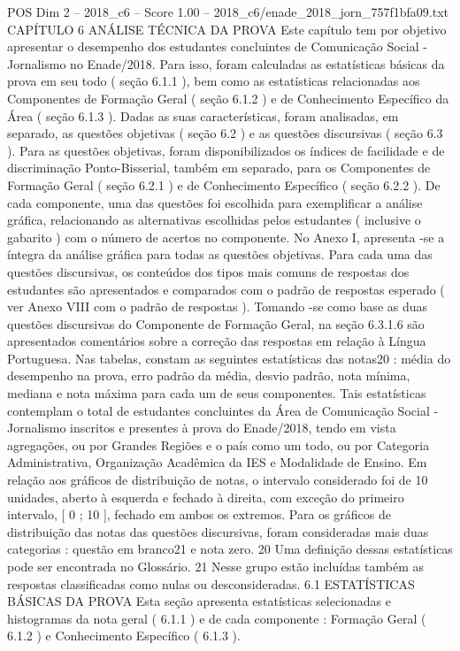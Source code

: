 \begin{textsample}{POS Dim 2 – 2018\_c6 – Score 1.00 – 2018\_c6/enade\_2018\_jorn\_757f1bfa09.txt}  \label{ex:f2_pos_199}
CAPÍTULO 6 ANÁLISE TÉCNICA DA PROVA Este capítulo tem por objetivo apresentar o desempenho dos estudantes concluintes de Comunicação Social - Jornalismo no Enade/2018.
Para isso, foram calculadas as estatísticas básicas da prova em seu todo ( seção 6.1.1 ), bem como as estatísticas relacionadas aos Componentes de Formação Geral ( seção 6.1.2 ) e de Conhecimento Específico da Área ( seção 6.1.3 ).
Dadas as suas características, foram analisadas, em separado, as questões objetivas ( seção 6.2 ) e as questões discursivas ( seção 6.3 ).
Para as questões objetivas, foram disponibilizados os índices de facilidade e de discriminação Ponto-Bisserial, também em separado, para os Componentes de Formação Geral ( seção 6.2.1 ) e de Conhecimento Específico ( seção 6.2.2 ).
De cada componente, uma das questões foi escolhida para exemplificar a análise gráfica, relacionando as alternativas escolhidas pelos estudantes ( inclusive o gabarito ) com o número de acertos no componente.
No Anexo I, apresenta -se a íntegra da análise gráfica para todas as questões objetivas.
Para cada uma das questões discursivas, os conteúdos dos tipos mais comuns de respostas dos estudantes são apresentados e comparados com o padrão de respostas esperado ( ver Anexo VIII com o padrão de respostas ).
Tomando -se como base as duas questões discursivas do Componente de Formação Geral, na seção 6.3.1.6 são apresentados comentários sobre a correção das respostas em relação à Língua Portuguesa.
Nas tabelas, constam as seguintes estatísticas das notas20 : média do desempenho na prova, erro padrão da média, desvio padrão, nota mínima, mediana e nota máxima para cada um de seus componentes.
Tais estatísticas contemplam o total de estudantes concluintes da Área de Comunicação Social - Jornalismo inscritos e presentes à prova do Enade/2018, tendo em vista agregações, ou por Grandes Regiões e o país como um todo, ou por Categoria Administrativa, Organização Acadêmica da IES e Modalidade de Ensino.
Em relação aos gráficos de distribuição de notas, o intervalo considerado foi de 10 unidades, aberto à esquerda e fechado à direita, com exceção do primeiro intervalo, [ 0 ; 10 ], fechado em ambos os extremos.
Para os gráficos de distribuição das notas das questões discursivas, foram consideradas mais duas categorias : questão em branco21 e nota zero. 20 Uma definição dessas estatísticas pode ser encontrada no Glossário. 21 Nesse grupo estão incluídas também as respostas classificadas como nulas ou desconsideradas. 6.1 ESTATÍSTICAS BÁSICAS DA PROVA Esta seção apresenta estatísticas selecionadas e histogramas da nota geral ( 6.1.1 ) e de cada componente : Formação Geral ( 6.1.2 ) e Conhecimento Específico ( 6.1.3 ).

\end{textsample}
